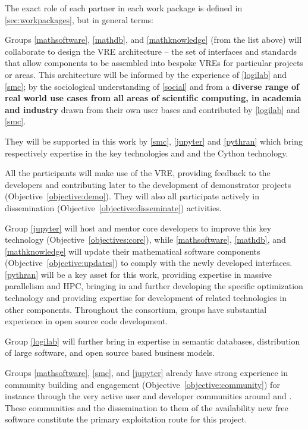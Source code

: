The exact role of each partner in each work package is defined
in \ref{sec:workpackages}, but in general terms:
\begin{compactitem}
\item Groups \ref{mathsoftware}, \ref{mathdb}, and
\ref{mathknowledge} (from the list above) will collaborate to design the \TheProject VRE
architecture -- the set of interfaces and standards that allow
components to be assembled into bespoke VREs for particular projects
or areas. This architecture will be informed  by the
experience of \ref{logilab} and \ref{smc}; by the sociological
understanding of \ref{social} and from a
\textbf{diverse range of real world use cases from all areas of scientific
  computing, in academia and industry} drawn from their own user bases
and contributed by \ref{logilab} and \ref{smc}.

They will be supported in this work by \ref{smc}, \ref{jupyter} and \ref{pythran} which
bring respectively expertise in the key technologies \SMC and \Jupyter and the Cython
technology.

\item All the participants will make use of the \TheProject VRE, providing feedback to the
  developers and contributing later to the development of demonstrator projects
  (Objective~\ref{objective:demo}). They will also all participate actively in
  dissemination (Objective~\ref{objective:disseminate}) activities.

\item Group \ref{jupyter} will host and mentor core \Jupyter developers to improve this
  key technology (Objective~\ref{objectives:core}), while \ref{mathsoftware},
  \ref{mathdb}, and \ref{mathknowledge} will update their mathematical software components
  (Objective~\ref{objective:updates}) to comply with the newly developed
  interfaces. \ref{pythran} will be a key asset for this work, providing expertise in
  massive parallelism and HPC, bringing in and further developing the specific \Pythran
  optimization technology and providing expertise for development of related technologies
  in other components.  Throughout the consortium, groups have substantial
  experience in open source code development.

\item Group \ref{logilab} will further bring in expertise in semantic databases,
  distribution of large software, and open source based business models.

\item Groups \ref{mathsoftware}, \ref{smc}, and \ref{jupyter} already
  have strong experience in community building and engagement
  (Objective~\ref{objective:community}) for instance through the very
  active user and developer communities around \GAP and \Sage. These
  communities and the dissemination to them of the availability new
  free software constitute the primary exploitation route for this
  project. 
\end{compactitem}

